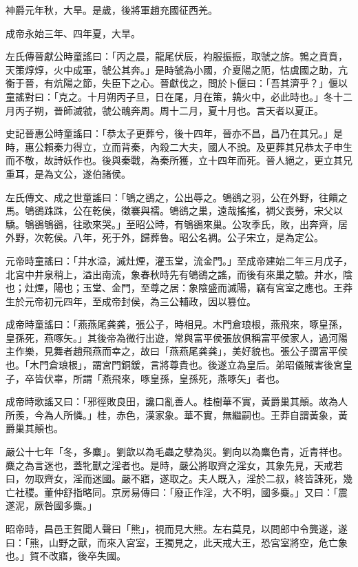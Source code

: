 \begin{pinyinscope}
神爵元年秋，大旱。是歲，後將軍趙充國征西羌。

成帝永始三年、四年夏，大旱。

左氏傳晉獻公時童謠曰：「丙之晨，龍尾伏辰，袀服振振，取虢之旂。鶉之賁賁，天策焞焞，火中成軍，虢公其奔。」是時虢為小國，介夏陽之阨，怙虞國之助，亢衡于晉，有炕陽之節，失臣下之心。晉獻伐之，問於卜偃曰：「吾其濟乎？」偃以童謠對曰：「克之。十月朔丙子旦，日在尾，月在策，鶉火中，必此時也。」冬十二月丙子朔，晉師滅虢，虢公醜奔周。周十二月，夏十月也。言天者以夏正。

史記晉惠公時童謠曰：「恭太子更葬兮，後十四年，晉亦不昌，昌乃在其兄。」是時，惠公賴秦力得立，立而背秦，內殺二大夫，國人不說。及更葬其兄恭太子申生而不敬，故詩妖作也。後與秦戰，為秦所獲，立十四年而死。晉人絕之，更立其兄重耳，是為文公，遂伯諸侯。

左氏傳文、成之世童謠曰：「鴝之鵒之，公出辱之。鴝鵒之羽，公在外野，往饋之馬。鴝鵒跦跦，公在乾侯，徵褰與襦。鴝鵒之巢，遠哉搖搖，裯父喪勞，宋父以驕。鴝鵒鴝鵒，往歌來哭。」至昭公時，有鴝鵒來巢。公攻季氏，敗，出奔齊，居外野，次乾侯。八年，死于外，歸葬魯。昭公名裯。公子宋立，是為定公。

元帝時童謠曰：「井水溢，滅灶煙，灌玉堂，流金門。」至成帝建始二年三月戊子，北宮中井泉稍上，溢出南流，象春秋時先有鴝鵒之謠，而後有來巢之驗。井水，陰也；灶煙，陽也；玉堂、金門，至尊之居：象陰盛而滅陽，竊有宮室之應也。王莽生於元帝初元四年，至成帝封侯，為三公輔政，因以篡位。

成帝時童謠曰：「燕燕尾龚龚，張公子，時相見。木門倉琅根，燕飛來，啄皇孫，皇孫死，燕啄矢。」其後帝為微行出遊，常與富平侯張放俱稱富平侯家人，過河陽主作樂，見舞者趙飛燕而幸之，故曰「燕燕尾龚龚」，美好貌也。張公子謂富平侯也。「木門倉琅根」，謂宮門銅鍰，言將尊貴也。後遂立為皇后。弟昭儀賊害後宮皇子，卒皆伏辜，所謂「燕飛來，啄皇孫，皇孫死，燕啄矢」者也。

成帝時歌謠又曰：「邪徑敗良田，讒口亂善人。桂樹華不實，黃爵巢其顛。故為人所羨，今為人所憐。」桂，赤色，漢家象。華不實，無繼嗣也。王莽自謂黃象，黃爵巢其顛也。

嚴公十七年「冬，多麋」。劉歆以為毛蟲之孽為災。劉向以為麋色青，近青祥也。麋之為言迷也，蓋牝獸之淫者也。是時，嚴公將取齊之淫女，其象先見，天戒若曰，勿取齊女，淫而迷國。嚴不寤，遂取之。夫人既入，淫於二叔，終皆誅死，幾亡社稷。董仲舒指略同。京房易傳曰：「廢正作淫，大不明，國多麋。」又曰：「震遂泥，厥咎國多麋。」

昭帝時，昌邑王賀聞人聲曰「熊」，視而見大熊。左右莫見，以問郎中令龔遂，遂曰：「熊，山野之獸，而來入宮室，王獨見之，此天戒大王，恐宮室將空，危亡象也。」賀不改寤，後卒失國。


\end{pinyinscope}
